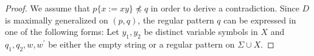   \begin{proof}
  We assume that $p \{ x := xy \} \not\preceq q$ in order to derive a contradiction.
%
%
%
%
Since $D$ is maximally generalized on $(p,q)$, the regular pattern $q$ can be expressed in one of the following forms: Let $y_{1}, y_{2}$ be distinct variable symbols in $X$ and $q_{1}, q_{2}, w, w^{\prime}$ be either the empty string or a regular pattern on $\Sigma\cup X$.


\end{proof}
